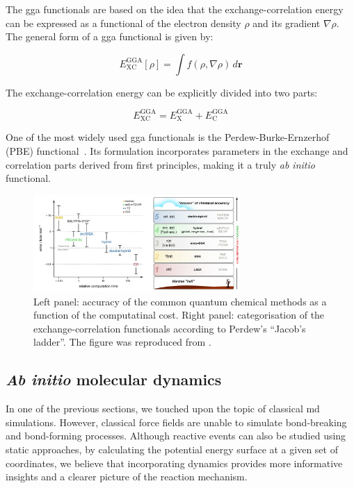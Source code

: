 The \ac{gga} functionals are based on the idea that the exchange-correlation energy can be expressed as a functional of the electron density $\rho$ and its gradient $\nabla \rho$. The general form of a \ac{gga} functional is given by:

\begin{equation}
E_{\text{XC}}^{\text{GGA}}[\rho] = \int f(\rho, \nabla\rho) \, d\mathbf{r}
\label{eq:gga_functional}
\end{equation}

The exchange-correlation energy can be explicitly divided into two parts:

\begin{equation}
E_{\text{XC}}^{\text{GGA}} = E_{\text{X}}^{\text{GGA}} + E_{\text{C}}^{\text{GGA}}
\label{eq:gga_xc}
\end{equation}

One of the most widely used \ac{gga} functionals is the Perdew-Burke-Ernzerhof (PBE) functional~\citep{perdewGeneralizedGradientApproximation1996}. Its formulation incorporates parameters in the exchange and correlation parts derived from first principles, making it a truly \textit{ab initio} functional.

\begin{figure}[b!]
    \centering
    \includegraphics[width=0.7\textwidth]{Figures/2_Theory/theory_jacobs_ladder.png}
    \caption{Left panel: accuracy of the common quantum chemical methods as a function of the computatinal cost. Right panel: categorisation of the exchange-correlation functionals according to Perdew's ``Jacob's ladder''. The figure was reproduced from \citep{burschBestPracticeDFTProtocols2022}.}
    \label{fig:jacobs_ladder}
\end{figure}



\subsection{\textit{Ab initio} molecular dynamics}
In one of the previous sections, we touched upon the topic of classical \ac{md} simulations. However, classical force fields are unable to simulate bond-breaking and bond-forming processes. Although reactive events can also be studied using static approaches, by calculating the potential energy surface at a given set of coordinates, we believe that incorporating dynamics provides more informative insights and a clearer picture of the reaction mechanism.

